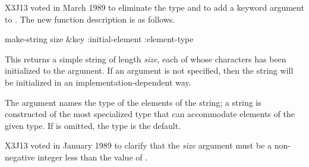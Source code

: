 \begin{newer}
X3J13 voted in March 1989 
to eliminate the type  and to add a keyword
argument  to .  The new function
description is as follows.

\begin{defun}[Function]
make-string size &key :initial-element :element-type

This returns a simple string
of length {\it size}, each of whose characters
has been initialized to the  argument.
If an  argument is not specified, then the string will
be initialized in an implementation-dependent way.

The  argument names the type of the elements
of the string; a string is constructed of the most specialized type
that can accommodate elements of the given type.  If 
is omitted, the type  is the default.

X3J13 voted in January 1989
to clarify that the {\it size} argument
must be a non-negative integer less than the value of
.
\end{defun}
\end{newer}



